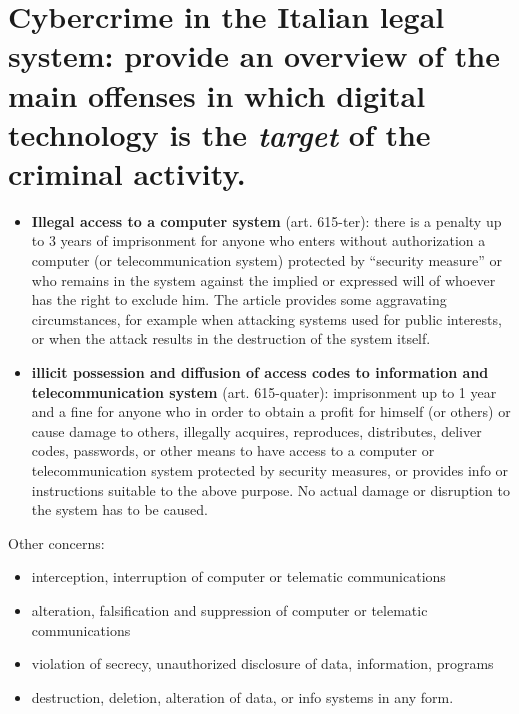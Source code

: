 \documentclass[a4paper, 11pt]{article}
\begin{document}
\section{Cybercrime in the Italian legal system: provide an overview of the main offenses in which digital technology is the \textit{target} of the criminal activity.}
\begin{itemize}
\item \textbf{Illegal access to a computer system} (art. 615-ter): there is a penalty up to 3 years of imprisonment for anyone who enters without authorization a computer (or telecommunication system) protected by ``security measure'' or who remains in the system against the implied or expressed will of whoever has the right to exclude him. The article provides some aggravating circumstances, for example when attacking systems used for public interests, or when the attack results in the destruction of the system itself.
\item \textbf{illicit possession and diffusion of access codes to information and telecommunication system} (art. 615-quater): imprisonment up to 1 year and a fine for anyone who in order to obtain a profit for himself (or others) or cause damage to others, illegally acquires, reproduces, distributes, deliver codes, passwords, or other means to have access to a computer or telecommunication system protected by security
measures, or provides info or instructions suitable to the above purpose. No actual damage or disruption to the system has to be caused.
\end{itemize}

Other concerns:
\begin{itemize}
\item interception, interruption of computer or telematic communications
\item alteration, falsification and suppression of computer or telematic communications
\item violation of secrecy, unauthorized disclosure of data, information, programs
\item destruction, deletion, alteration of data, or info systems in any form.
\end{itemize}
\end{document}
